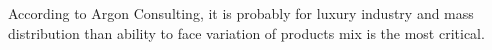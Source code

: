 According to Argon Consulting, it is probably for luxury industry and mass distribution than ability to face variation of products mix is the most critical.












